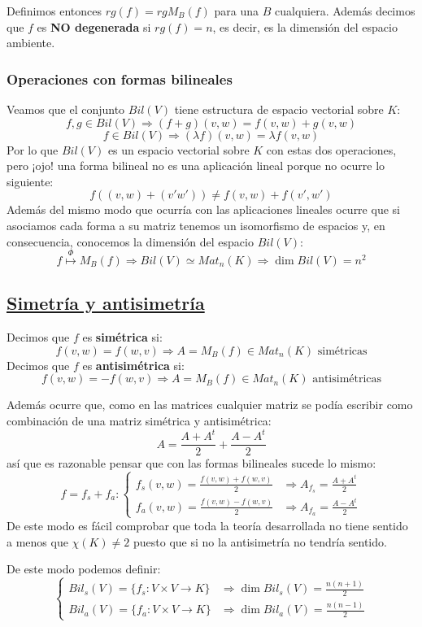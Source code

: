 \documentclass[10pt,a4paper,openright]{book}
\begin{document}
Definimos entonces $rg(f)=rg M_B(f)$ para una $B$ cualquiera. Además decimos que $f$ es \textbf{NO degenerada} si $rg(f)=n$, es decir, es la dimensión del espacio ambiente.

\subsubsection*{Operaciones con formas bilineales}
Veamos que el conjunto $Bil(V)$ tiene estructura de espacio vectorial sobre $K$:
$$f,g\in Bil(V)\Rightarrow (f+g)(v,w)=f(v,w)+g(v,w)$$
$$f\in Bil(V)\Rightarrow (\lambda f)(v,w)=\lambda f(v,w)$$
Por lo que $Bil(V)$ es un espacio vectorial sobre $K$ con estas dos operaciones, pero ¡ojo! una forma bilineal no es una aplicación lineal porque no ocurre lo siguiente:
$$f((v,w)+(v'w'))\neq f(v,w)+f(v',w')$$
Además del mismo modo que ocurría con las aplicaciones lineales ocurre que si asociamos cada forma a su matriz tenemos un isomorfismo de espacios y, en consecuencia, conocemos la dimensión del espacio $Bil(V)$:
$$f\stackrel{\Phi}{\longmapsto} M_B(f)\Rightarrow Bil(V)\simeq Mat_n(K)\Rightarrow \dim Bil(V)=n^2$$

\subsection*{\underline{Simetría y antisimetría}}
Decimos que $f$ es \textbf{simétrica} si:
$$f(v,w)=f(w,v)\Rightarrow A=M_B(f)\in Mat_n(K) \mbox{ simétricas}$$
Decimos que $f$ es \textbf{antisimétrica} si:
$$f(v,w)=-f(w,v)\Rightarrow A=M_B(f)\in Mat_n(K) \mbox{ antisimétricas}$$

Además ocurre que, como en las matrices cualquier matriz se podía escribir como combinación de una matriz simétrica y antisimétrica:
$$A=\frac{A+A^t}{2}+\frac{A-A^t}{2}$$
así que es razonable pensar que con las formas bilineales sucede lo mismo:
$$f=f_s+f_a: \begin{cases} f_s(v,w)=\frac{f(v,w)+f(w,v)}{2}& \Rightarrow A_{f_s} = \frac{A+A^t}{2} \\ f_a(v,w)=\frac{f(v,w)-f(w,v)}{2} &\Rightarrow A_{f_a} = \frac{A-A^t}{2} \end{cases}$$
De este modo es fácil comprobar que toda la teoría desarrollada no tiene sentido a menos que $\chi(K)\neq 2$ puesto que si no la antisimetría no tendría sentido.

De este modo podemos definir:
$$\begin{cases}Bil_s(V)=\{f_s: V\times V\rightarrow K\} &\Rightarrow \dim Bil_s(V)=\frac{n(n+1)}{2} \\ Bil_a(V)=\{f_a: V\times V\rightarrow K\} &\Rightarrow \dim Bil_a(V)=\frac{n(n-1)}{2}\end{cases}$$
\end{document}
